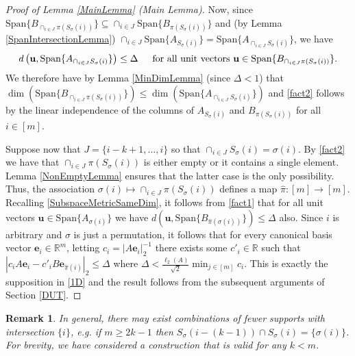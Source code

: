 \documentclass[journal, onecolumn]{IEEEtran}
\newtheorem{remark}{Remark}
\begin{document}
\begin{proof}[Proof of Lemma \ref{MainLemma} (Main Lemma)]
Now, since \mbox{$\text{Span}\{B_{\cap_{i \in J}\pi(S_\sigma(i))}\} \subseteq \cap_{i \in J} \text{Span}\{B_{\pi(S_\sigma(i))}\}$} and (by Lemma \ref{SpanIntersectionLemma}) $\cap_{i \in J}  \text{Span}\{A_{S_\sigma(i)}\} = \text{Span}\{A_{\cap_{i \in J}  S_\sigma(i)}\}$, we have
\begin{align}\label{fact1}
d\left( \mathbf{u}, \text{Span}\{A_{\cap_{i \in J} S_\sigma(i)}\} \right) \leq \Delta \indent \text{for all unit vectors } \mathbf{u} \in \text{Span}\{B_{\cap_{i \in J}\pi(S_\sigma(i))}\}.
\end{align}
We therefore have by Lemma \ref{MinDimLemma} (since $\Delta < 1$) that $\dim(\text{Span}\{B_{\cap_{i \in J}\pi(S_\sigma(i))}\}) \leq \dim(\text{Span}\{A_{\cap_{i \in J} S_\sigma(i)}\})$ and \eqref{fact2} follows by the linear independence of the columns of $A_{S_\sigma(i)}$ and $B_{\pi(S_\sigma(i))}$ for all $i \in [m]$.

Suppose now that $J = \{i-k+1, \ldots, i\}$ so that $\cap_{i \in J} S_\sigma(i) = \sigma(i)$. By \eqref{fact2} we have that $\cap_{i \in J} \pi(S_\sigma(i))$ is either empty or it contains a single element. Lemma \ref{NonEmptyLemma} ensures that the latter case is the only possibility. Thus, the association $\sigma(i) \mapsto \cap_{i \in J} \pi(S_\sigma(i))$ defines a map $\hat \pi: [m] \to [m]$. Recalling \eqref{SubspaceMetricSameDim}, it follows from \eqref{fact1} that for all unit vectors $\mathbf{u} \in \text{Span}\{A_{\sigma(i)}\}$ we have $d\left( \mathbf{u}, \text{Span}\{B_{\hat \pi(\sigma(i))}\}\right) \leq \Delta$ also. Since $i$ is arbitrary and $\sigma$ is just a permutation, it follows that for every canonical basis vector $\mathbf{e}_i \in \mathbb{R}^m$, letting $c_i = |A\mathbf{e}_i|_2^{-1}$ there exists some $c'_i \in \mathbb{R}$ such that $|c_iA\mathbf{e}_i - c'_iB\mathbf{e}_{\hat \pi(i)}|_2 \leq \Delta$ where $\Delta < \frac{\ell_2(A)}{\sqrt{2}} \min_{j \in [m]} c_i$. This is exactly the supposition in \eqref{1D} and the result follows from the subsequent arguments of Section \ref{DUT}. 
\end{proof}

\begin{remark} In general, there may exist combinations of fewer supports with intersection $\{i\}$, e.g. if $m \geq 2k-1$ then $S_\sigma(i - (k-1)) \cap S_\sigma(i) = \{\sigma(i)\}$. For brevity, we have considered a construction that is valid for any $k < m$.
\end{remark}

\end{document}
